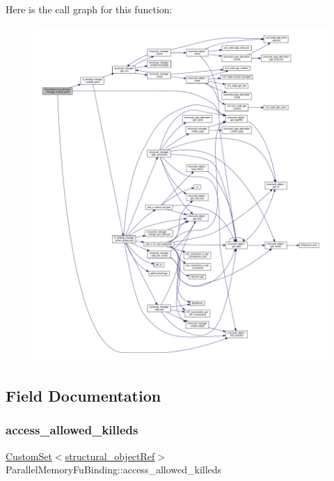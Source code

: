 Here is the call graph for this function\+:
\nopagebreak
\begin{figure}[H]
\begin{center}
\leavevmode
\includegraphics[width=350pt]{de/d40/classParallelMemoryFuBinding_a1e98fb5e73a6fb77e0b26e4bdf5d3ba3_cgraph}
\end{center}
\end{figure}


\subsection{Field Documentation}
\mbox{\label{classParallelMemoryFuBinding_aeb2e85b1a78a4cc44ca38dbd2c9167ae}} 
\subsubsection{\texorpdfstring{access\+\_\+allowed\+\_\+killeds}{access\_allowed\_killeds}}
{\footnotesize\ttfamily \hyperlink{custom__set_8hpp_a615bc2f42fc38a4bb1790d12c759e86f}{Custom\+Set}$<$\hyperlink{structural__objects_8hpp_a8ea5f8cc50ab8f4c31e2751074ff60b2}{structural\+\_\+object\+Ref}$>$ Parallel\+Memory\+Fu\+Binding\+::access\+\_\+allowed\+\_\+killeds\hspace{0.3cm}{\ttfamily [protected]}}



